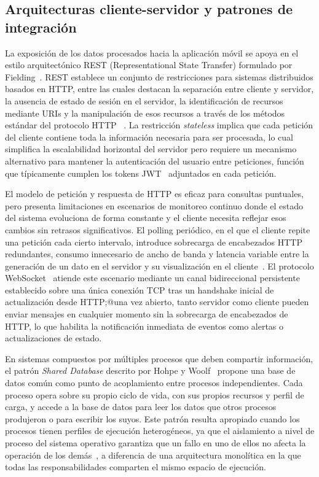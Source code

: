 \subsection{Arquitecturas cliente-servidor y patrones de integración}

La exposición de los datos procesados hacia la aplicación móvil se 
apoya en el estilo arquitectónico REST (Representational State 
Transfer) formulado por Fielding~\cite{fielding2000rest}. REST 
establece un conjunto de restricciones para sistemas distribuidos 
basados en HTTP, entre las cuales destacan la separación entre 
cliente y servidor, la ausencia de estado de sesión en el servidor, 
la identificación de recursos mediante URIs y la manipulación de 
esos recursos a través de los métodos estándar del protocolo HTTP 
~\cite{rfc9110}. La restricción \textit{stateless} implica que cada 
petición del cliente contiene toda la información necesaria para 
ser procesada, lo cual simplifica la escalabilidad horizontal del 
servidor pero requiere un mecanismo alternativo para mantener la 
autenticación del usuario entre peticiones, función que típicamente 
cumplen los tokens JWT~\cite{rfc7519} adjuntados en cada petición.

El modelo de petición y respuesta de HTTP es eficaz para consultas 
puntuales, pero presenta limitaciones en escenarios de monitoreo 
continuo donde el estado del sistema evoluciona de forma constante 
y el cliente necesita reflejar esos cambios sin retrasos 
significativos. El polling periódico, en el que el cliente repite 
una petición cada cierto intervalo, introduce sobrecarga de 
encabezados HTTP redundantes, consumo innecesario de ancho de banda 
y latencia variable entre la generación de un dato en el servidor y 
su visualización en el cliente~\cite{rfc9110}. El protocolo 
WebSocket~\cite{rfc6455} atiende este escenario mediante un canal 
bidireccional persistente establecido sobre una única conexión TCP 
tras un handshake inicial de actualización desde HTTP;@una vez 
abierto, tanto servidor como cliente pueden enviar mensajes en 
cualquier momento sin la sobrecarga de encabezados de HTTP, lo que 
habilita la notificación inmediata de eventos como alertas o 
actualizaciones de estado.

En sistemas compuestos por múltiples procesos que deben compartir 
información, el patrón \textit{Shared Database} descrito por Hohpe 
y Woolf~\cite{hohpe2003eip} propone una base de datos común como 
punto de acoplamiento entre procesos independientes. Cada proceso 
opera sobre su propio ciclo de vida, con sus propios recursos y 
perfil de carga, y accede a la base de datos para leer los datos 
que otros procesos produjeron o para escribir los suyos. Este 
patrón resulta apropiado cuando los procesos tienen perfiles de 
ejecución heterogéneos, ya que el aislamiento a nivel de proceso 
del sistema operativo garantiza que un fallo en uno de ellos no 
afecta la operación de los demás~\cite{silberschatz2018os}, a 
diferencia de una arquitectura monolítica en la que todas las 
responsabilidades comparten el mismo espacio de ejecución.

